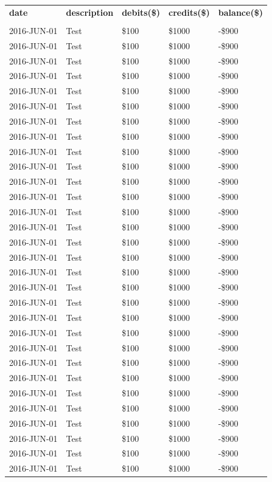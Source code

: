 \documentclass{article}%
\begin{document}
\begin{longtabu}{X[l] X[2l] X[r] X[r] X[r]}%
%
\textbf{date}&\textbf{description}&\textbf{debits(\$)}&\textbf{credits(\$)}&\textbf{balance(\$)}\\%
&&&&\\%
\hline%
%
2016{-}JUN{-}01&Test&\$100&\$1000&{-}\$900\\%
2016{-}JUN{-}01&Test&\$100&\$1000&{-}\$900\\%
%
2016{-}JUN{-}01&Test&\$100&\$1000&{-}\$900\\%
2016{-}JUN{-}01&Test&\$100&\$1000&{-}\$900\\%
%
2016{-}JUN{-}01&Test&\$100&\$1000&{-}\$900\\%
2016{-}JUN{-}01&Test&\$100&\$1000&{-}\$900\\%
%
2016{-}JUN{-}01&Test&\$100&\$1000&{-}\$900\\%
2016{-}JUN{-}01&Test&\$100&\$1000&{-}\$900\\%
%
2016{-}JUN{-}01&Test&\$100&\$1000&{-}\$900\\%
2016{-}JUN{-}01&Test&\$100&\$1000&{-}\$900\\%
%
2016{-}JUN{-}01&Test&\$100&\$1000&{-}\$900\\%
2016{-}JUN{-}01&Test&\$100&\$1000&{-}\$900\\%
%
2016{-}JUN{-}01&Test&\$100&\$1000&{-}\$900\\%
2016{-}JUN{-}01&Test&\$100&\$1000&{-}\$900\\%
%
2016{-}JUN{-}01&Test&\$100&\$1000&{-}\$900\\%
2016{-}JUN{-}01&Test&\$100&\$1000&{-}\$900\\%
%
2016{-}JUN{-}01&Test&\$100&\$1000&{-}\$900\\%
2016{-}JUN{-}01&Test&\$100&\$1000&{-}\$900\\%
%
2016{-}JUN{-}01&Test&\$100&\$1000&{-}\$900\\%
2016{-}JUN{-}01&Test&\$100&\$1000&{-}\$900\\%
%
2016{-}JUN{-}01&Test&\$100&\$1000&{-}\$900\\%
2016{-}JUN{-}01&Test&\$100&\$1000&{-}\$900\\%
%
2016{-}JUN{-}01&Test&\$100&\$1000&{-}\$900\\%
2016{-}JUN{-}01&Test&\$100&\$1000&{-}\$900\\%
%
2016{-}JUN{-}01&Test&\$100&\$1000&{-}\$900\\%
2016{-}JUN{-}01&Test&\$100&\$1000&{-}\$900\\%
%
2016{-}JUN{-}01&Test&\$100&\$1000&{-}\$900\\%
2016{-}JUN{-}01&Test&\$100&\$1000&{-}\$900\\%
%
2016{-}JUN{-}01&Test&\$100&\$1000&{-}\$900\\%
2016{-}JUN{-}01&Test&\$100&\$1000&{-}\$900\\%
\end{longtabu}%
\end{document}
